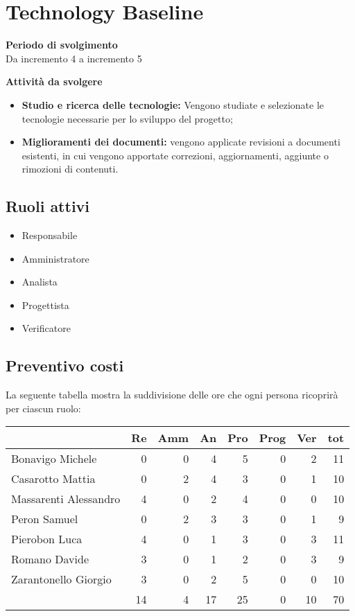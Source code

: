 \section{Technology Baseline}

\textbf{Periodo di svolgimento}
\\ Da incremento 4 a incremento 5

\textbf{Attività da svolgere}
    \begin{itemize}
        \item \textbf{Studio e ricerca delle tecnologie:} Vengono studiate e selezionate le tecnologie necessarie per lo sviluppo del progetto; 
        \item \textbf{Miglioramenti dei documenti:} vengono applicate revisioni a documenti esistenti, in cui vengono apportate correzioni, aggiornamenti, aggiunte o rimozioni di contenuti.
    \end{itemize}

\subsection{Ruoli attivi}
\begin{itemize}
    \item Responsabile
    \item Amministratore 
    \item Analista 
    \item Progettista 
    \item Verificatore 
\end{itemize}

\subsection{Preventivo costi}

La seguente tabella mostra la suddivisione delle ore che ogni persona ricoprirà per ciascun ruolo:

\begin{table}[H]
    \begin{tabularx}{\linewidth}{X|rrrrrrr}
    \rowcolor{gray!30}& Re & Amm & An & Pro & Prog & Ver & tot \\
    \hline
    Bonavigo Michele                        & 0 & 0 & 4 & 5 & 0 & 2 & 11 \\
    \rowcolor{gray!10}Casarotto Mattia      & 0 & 2 & 4 & 3 & 0 & 1 & 10 \\
    Massarenti Alessandro                   & 4 & 0 & 2 & 4 & 0 & 0 & 10 \\
    \rowcolor{gray!10}Peron Samuel          & 0 & 2 & 3 & 3 & 0 & 1 & 9 \\
    Pierobon Luca                           & 4 & 0 & 1 & 3 & 0 & 3 & 11 \\
    \rowcolor{gray!10}Romano Davide         & 3 & 0 & 1 & 2 & 0 & 3 & 9 \\
    Zarantonello Giorgio                    & 3 & 0 & 2 & 5 & 0 & 0 & 10 \\
    \hline                                  & 14 & 4 & 17 & 25 & 0 & 10 & 70 \\ 
    \end{tabularx}
\end{table}

